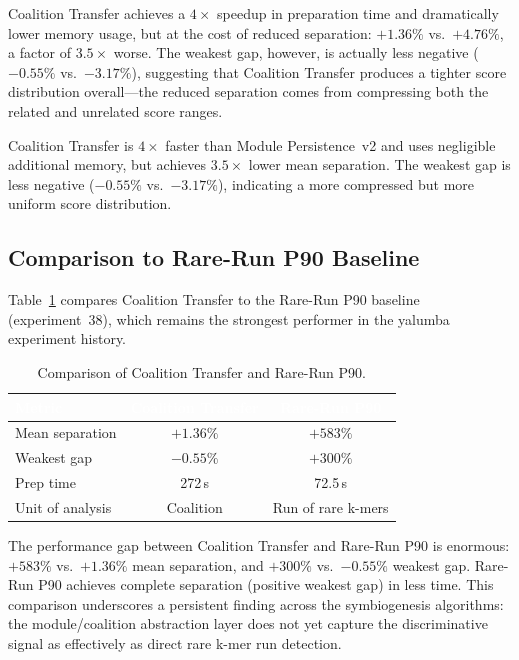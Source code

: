\documentclass{../yalumba}
\begin{document}
Coalition Transfer achieves a $4{\times}$ speedup in preparation time and
dramatically lower memory usage, but at the cost of reduced separation:
$+1.36\%$ vs.\ $+4.76\%$, a factor of $3.5{\times}$ worse.  The weakest
gap, however, is actually less negative ($-0.55\%$ vs.\ $-3.17\%$),
suggesting that Coalition Transfer produces a tighter score distribution
overall---the reduced separation comes from compressing both the related
and unrelated score ranges.

\begin{keyfinding}
Coalition Transfer is $4{\times}$ faster than Module Persistence~v2 and uses
negligible additional memory, but achieves $3.5{\times}$ lower mean
separation.  The weakest gap is less negative ($-0.55\%$ vs.\ $-3.17\%$),
indicating a more compressed but more uniform score distribution.
\end{keyfinding}

\subsection{Comparison to Rare-Run P90 Baseline}
\label{sec:results-rarerun}

Table~\ref{tab:comparison-rarerun} compares Coalition Transfer to the
Rare-Run P90 baseline (experiment~38), which remains the strongest
performer in the yalumba experiment history.

\begin{table}[htbp]
\centering
\tablestyle
\caption{Comparison of Coalition Transfer and Rare-Run P90.}
\label{tab:comparison-rarerun}
\begin{tabular}{lcc}
\toprule
\rowcolor{table-header}
\textcolor{white}{\textbf{Metric}} &
\textcolor{white}{\textbf{Coalition Transfer}} &
\textcolor{white}{\textbf{Rare-Run P90}} \\
\midrule
Mean separation        & $+1.36\%$   & $+583\%$ \\
Weakest gap            & $-0.55\%$   & $+300\%$ \\
Prep time              & 272\,s      & 72.5\,s \\
Unit of analysis       & Coalition   & Run of rare k-mers \\
\bottomrule
\end{tabular}
\end{table}

The performance gap between Coalition Transfer and Rare-Run P90 is enormous:
$+583\%$ vs.\ $+1.36\%$ mean separation, and $+300\%$ vs.\ $-0.55\%$ weakest
gap.  Rare-Run P90 achieves complete separation (positive weakest gap) in
less time.  This comparison underscores a persistent finding across the
symbiogenesis algorithms: the module/coalition abstraction layer does not
yet capture the discriminative signal as effectively as direct rare k-mer
run detection.
\end{document}
